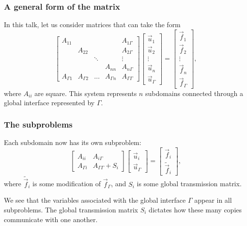 \documentclass{beamer}
\begin{document}
\begin{frame}
\frametitle{A general form of the matrix}

In this talk, let us consider matrices that can take the form
\begin{equation} \label{eq: lin sys}
	\begin{bmatrix}
		A_{11} & & & & A_{1 \Gamma} \\
		& A_{22} & & & A_{2 \Gamma} \\
		& & \ddots & & \vdots \\
		& & & A_{nn} & A_{n \Gamma} \\
		A_{\Gamma 1} & A_{\Gamma 2} & \dots & A_{\Gamma n} & A_{\Gamma \Gamma}
	\end{bmatrix}
	\begin{bmatrix} \vec{u}_1 \\ \vec{u}_2 \\ \vdots \\ \vec{u}_n \\ \vec{u}_\Gamma \end{bmatrix}
	=
	\begin{bmatrix} \vec{f}_1 \\ \vec{f}_2 \\ \vdots \\ \vec{f}_n \\ \vec{f}_\Gamma \end{bmatrix},
\end{equation}
where $A_{ii}$ are square.
This system represents $n$ subdomains connected through a global interface represented by $\Gamma$.

\end{frame}

\begin{frame}
\frametitle{The subproblems}

Each subdomain now has its own subproblem:
\begin{equation} \label{eq: subproblem}
	\begin{bmatrix}
		A_{ii} & A_{i \Gamma} \\
		A_{\Gamma i} & A_{\Gamma \Gamma} + S_i
	\end{bmatrix}
	\begin{bmatrix} \vec{u}_i \\ \vec{u}_\Gamma \end{bmatrix}
	=
	\begin{bmatrix} \vec{f}_i \\ \tilde{\vec{f}}_i \end{bmatrix},
\end{equation}
where $\tilde{\vec{f}}_i$ is some modification of $\vec{f}_\Gamma$,
and $S_i$ is some global transmission matrix.

We see that the variables associated with the global interface $\Gamma$ appear in all subproblems.
The global transmission matrix $S_i$ dictates how these many copies communicate with one another.
\end{frame}
\end{document}
